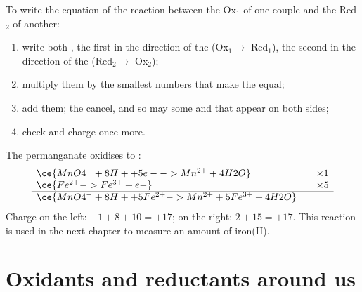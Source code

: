 \begin{method}\label{met:g11:redox:combine}
To write the equation of the reaction between the  Ox$_1$ of one
couple and the  Red$_2$ of another:
\begin{enumerate}
  \item write both , the first in the direction of the
         (Ox$_1 \to$ Red$_1$), the second in the direction of
        the  (Red$_2 \to$ Ox$_2$);
  \item multiply them by the smallest numbers that make the 
        equal;
  \item add them; the  cancel, and so may some  and
         that appear on both sides;
  \item check  and charge once more.
\end{enumerate}
\end{method}

\begin{example}\label{ex:g11:redox:mno4-fe}
The permanganate  oxidises   to :
\[
\begin{array}{l@{\qquad}l}
  \ce{MnO4^- + 8H+ + 5e- -> Mn^{2+} + 4H2O} & \times 1\\
  \ce{Fe^{2+} -> Fe^{3+} + e-} & \times 5\\
  \hline
  \ce{MnO4^- + 8H+ + 5Fe^{2+} -> Mn^{2+} + 5Fe^{3+} + 4H2O} &
\end{array}
\]
Charge on the left: $-1 + 8 + 10 = +17$; on the right: $2 + 15 = +17$.
This reaction is used in the next chapter to measure an amount of
iron(II).
\end{example}

\section{Oxidants and reductants around us}

